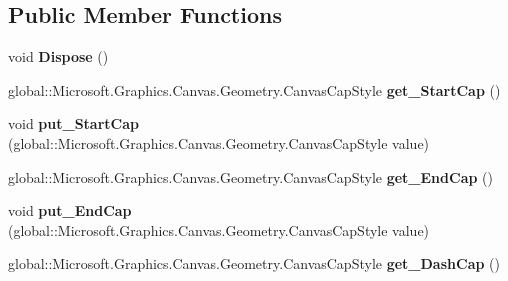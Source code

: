 \subsection*{Public Member Functions}
\begin{DoxyCompactItemize}
\item 
\mbox{\label{class_microsoft_1_1_graphics_1_1_canvas_1_1_geometry_1_1_canvas_stroke_style_ad363b1ddc2f498a833220cbfda7cee42}} 
void {\bfseries Dispose} ()
\item 
\mbox{\label{class_microsoft_1_1_graphics_1_1_canvas_1_1_geometry_1_1_canvas_stroke_style_ad88c6468f388b2eb08a9719477f05865}} 
global\+::\+Microsoft.\+Graphics.\+Canvas.\+Geometry.\+Canvas\+Cap\+Style {\bfseries get\+\_\+\+Start\+Cap} ()
\item 
\mbox{\label{class_microsoft_1_1_graphics_1_1_canvas_1_1_geometry_1_1_canvas_stroke_style_a7d8f82f4ff8e2d65759fc7359e698584}} 
void {\bfseries put\+\_\+\+Start\+Cap} (global\+::\+Microsoft.\+Graphics.\+Canvas.\+Geometry.\+Canvas\+Cap\+Style value)
\item 
\mbox{\label{class_microsoft_1_1_graphics_1_1_canvas_1_1_geometry_1_1_canvas_stroke_style_ab89db4f7c48a94cfd80ea551415cd2f0}} 
global\+::\+Microsoft.\+Graphics.\+Canvas.\+Geometry.\+Canvas\+Cap\+Style {\bfseries get\+\_\+\+End\+Cap} ()
\item 
\mbox{\label{class_microsoft_1_1_graphics_1_1_canvas_1_1_geometry_1_1_canvas_stroke_style_a7b6afd8e63542d3d893b8ba1dba200df}} 
void {\bfseries put\+\_\+\+End\+Cap} (global\+::\+Microsoft.\+Graphics.\+Canvas.\+Geometry.\+Canvas\+Cap\+Style value)
\item 
\mbox{\label{class_microsoft_1_1_graphics_1_1_canvas_1_1_geometry_1_1_canvas_stroke_style_a4ed5fa2a457de0566e9deccd86297f66}} 
global\+::\+Microsoft.\+Graphics.\+Canvas.\+Geometry.\+Canvas\+Cap\+Style {\bfseries get\+\_\+\+Dash\+Cap} ()

\end{DoxyCompactItemize}
